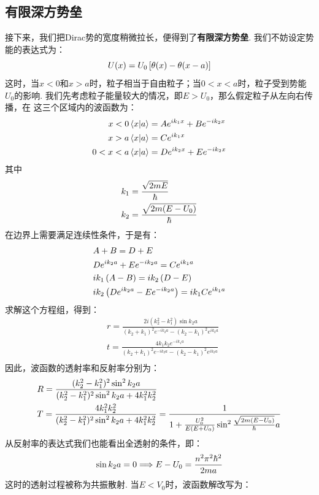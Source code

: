 \subsection{有限深方势垒}
接下来，我们把Dirac势的宽度稍微拉长，便得到了\textbf{有限深方势垒}. 我们不妨设定势能的表达式为：
\[
U(x) = U_{0}\left[{\theta(x) - \theta(x-a)}\right]
\]
这时，当\(x<0\)和\(x>a\)时，粒子相当于自由粒子；当\(0<x<a\)时，粒子受到势能\(U_{0}\)的影响. 我们先考虑粒子能量较大的情况，即\(E>U_{0}\)，那么假定粒子从左向右传播，在
这三个区域内的波函数为：
\begin{align*}
x<0 
& \bra{x}\ket{a} = Ae^{ik_{1}x} + Be^{-ik_{2}x} \\
x>a
& \bra{x}\ket{a} = Ce^{ik_{1}x} \\
0<x<a 
& \bra{x}\ket{a} = De^{ik_{2}x} + Ee^{-ik_{2}x}
\end{align*}
其中
\begin{align*}
& k_{1} = \frac{\sqrt{2mE}}{\hbar} \\
& k_{2} = \frac{\sqrt{2m(E-U_{0})}}{\hbar}
\end{align*}
在边界上需要满足连续性条件，于是有：
\begin{align*}
& A + B = D + E \\
& De^{ik_{2}a} + Ee^{-ik_{2}a} = Ce^{ik_{1}a} \\
& ik_{1}\left({A - B}\right) = ik_{2}\left({D-E}\right) \\
& ik_{2}\left({De^{ik_{2}a} - Ee^{-ik_{2}a}}\right) = ik_{1}Ce^{ik_{1}a}
\end{align*}
求解这个方程组，得到：
\begin{align*}
& r = \frac{2i(k_{2}^{2} - k_{1}^{2})\sin k_{2}a}{(k_{2} + k_{1})^{2}e^{-ik_{2}a} - (k_{2} - k_{1})^{2}e^{ik_{2}a}} \\
& t = \frac{4k_{1}k_{2}e^{-ik_{1}a}}{(k_{2} + k_{1})^{2}e^{-ik_{2}a} - (k_{2} - k_{1})^{2}e^{ik_{2}a}} \\
\end{align*}
因此，波函数的透射率和反射率分别为：
\begin{align*}
& R = \frac{(k_{2}^{2}-k_{1}^{2})^{2}\sin^{2}k_{2}a}{(k_{2}^{2}-k_{1}^{2})^{2}\sin^{2}k_{2}a + 4k_{1}^{2}k_{2}^{2}} \\
& T = \frac{4k_{1}^{2}k_{2}^{2}}{(k_{2}^{2}-k_{1}^{2})^{2}\sin^{2}k_{2}a + 4k_{1}^{2}k_{2}^{2}} = \frac{1}{1+\frac{U_{0}^{2}}{E(E+U_{0})}\sin^2\frac{\sqrt{2m(E-U_{0})}}{\hbar}a}
\end{align*}
从反射率的表达式我们也能看出全透射的条件，即：
\[
\sin k_{2}a = 0 \Longrightarrow E - U_{0} = \frac{n^2\pi^2\hbar^2}{2ma} 
\]
这时的透射过程被称为共振散射. 当\(E<V_{0}\)时，波函数解改写为：
